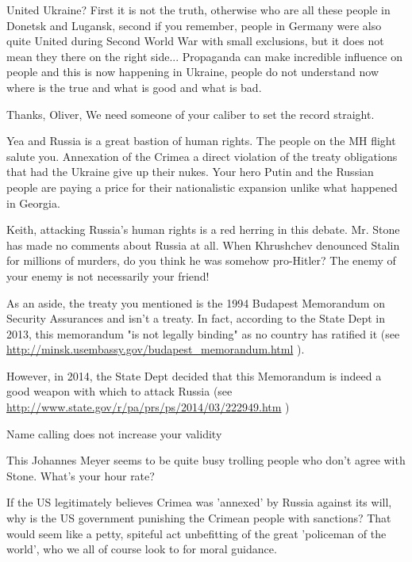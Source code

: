 \begin{itemize}
\begin{itemize}

United Ukraine? First it is not the truth, otherwise who are all these people
in Donetsk and Lugansk, second if you remember, people in Germany were also
quite United during Second World War with small exclusions, but it does not
mean they there on the right side... Propaganda can make incredible influence
on people and this is now happening in Ukraine, people do not understand now
where is the true and what is good and what is bad.

\end{itemize} %

Thanks, Oliver, We need someone of your caliber to set the record straight.


Yea and Russia is a great bastion of human rights. The people on the MH flight
salute you. Annexation of the Crimea a direct violation of the treaty
obligations that had the Ukraine give up their nukes. Your hero Putin and the
Russian people are paying a price for their nationalistic expansion unlike what
happened in Georgia.

\begin{itemize} %

Keith, attacking Russia's human rights is a red herring in this debate. Mr.
Stone has made no comments about Russia at all. When Khrushchev denounced
Stalin for millions of murders, do you think he was somehow pro-Hitler? The
enemy of your enemy is not necessarily your friend!

As an aside, the treaty you mentioned is the 1994 Budapest Memorandum on
Security Assurances and isn't a treaty. In fact, according to the State Dept in
2013, this memorandum "is not legally binding" as no country has ratified it
(see \url{http://minsk.usembassy.gov/budapest_memorandum.html} ).

However, in 2014, the State Dept decided that this Memorandum is indeed a good
weapon with which to attack Russia (see
\url{http://www.state.gov/r/pa/prs/ps/2014/03/222949.htm} )

Name calling does not increase your validity

This Johannes Meyer seems to be quite busy trolling people who don't agree with Stone. What's your hour rate?


If the US legitimately believes Crimea was 'annexed' by Russia against its
will, why is the US government punishing the Crimean people with sanctions?
That would seem like a petty, spiteful act unbefitting of the great 'policeman
of the world', who we all of course look to for moral guidance.


\end{itemize}
\end{itemize}
